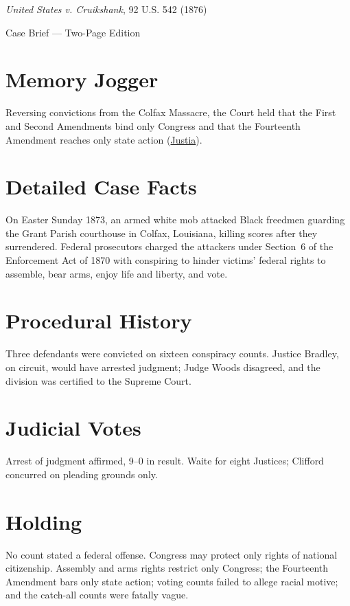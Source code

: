 \documentclass[12pt]{article}
\begin{document}
\begin{center}
{\LARGE \textit{United States v. Cruikshank}, 92 U.S. 542 (1876)\par}
\vspace{0.5em}
{\large Case Brief --- Two-Page Edition\par}
\end{center}

\section{Memory Jogger}
Reversing convictions from the Colfax Massacre, the Court held that the First and Second Amendments bind only Congress and that the Fourteenth Amendment reaches only state action (\href{https://supreme.justia.com/cases/federal/us/92/542/}{Justia}).

\section{Detailed Case Facts}
On Easter Sunday 1873, an armed white mob attacked Black freedmen guarding the Grant Parish courthouse in Colfax, Louisiana, killing scores after they surrendered. Federal prosecutors charged the attackers under Section~6 of the Enforcement Act of 1870 with conspiring to hinder victims' federal rights to assemble, bear arms, enjoy life and liberty, and vote.

\section{Procedural History}
Three defendants were convicted on sixteen conspiracy counts. Justice Bradley, on circuit, would have arrested judgment; Judge Woods disagreed, and the division was certified to the Supreme Court.

\section{Judicial Votes}
Arrest of judgment affirmed, 9--0 in result. Waite for eight Justices; Clifford concurred on pleading grounds only.

\section{Holding}
No count stated a federal offense. Congress may protect only rights of national citizenship. Assembly and arms rights restrict only Congress; the Fourteenth Amendment bars only state action; voting counts failed to allege racial motive; and the catch-all counts were fatally vague.
\end{document}
